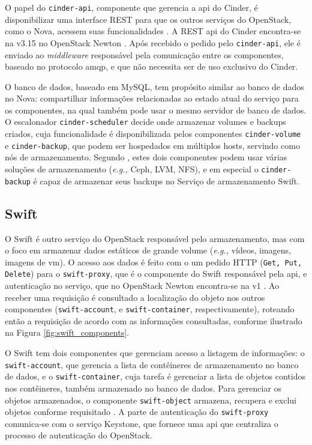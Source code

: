 O papel do \texttt{cinder-api}, componente que gerencia a \ac{api} do Cinder, é disponibilizar uma interface REST para que os outros serviços do OpenStack, como o Nova, acessem suas funcionalidades \cite{redhat:components}.
%
A REST \ac{api} do Cinder encontra-se na v3.15 no OpenStack Newton \cite{openstack:newton:api}.
%
Após recebido o pedido pelo \texttt{cinder-api}, ele é enviado ao \textit{middleware} responsável pela comunicação entre os componentes, baseado no protocolo \ac{amqp}, e que não necessita ser de uso exclusivo do Cinder.

O banco de dados, baseado em MySQL, tem propósito similar ao banco de dados no Nova: compartilhar informações relacionadas ao estado atual do serviço para os componentes, na qual também pode usar o mesmo servidor de banco de dados.
%
O escalonador \texttt{cinder-scheduler} decide onde armazenar volumes e backups criados, cuja funcionalidade é disponibilizada pelos componentes \texttt{cinder-volume} e \texttt{cinder-backup}, que podem ser hospedados em múltiplos hosts, servindo como nós de armazenamento.
%
Segundo , estes dois componentes podem usar várias soluções de armazenamento (\textit{e.g.,} Ceph, LVM, NFS), e em especial o \texttt{cinder-backup} é capaz de armazenar seus backups no Serviço de armazenamento Swift.

\subsection{Swift}

O Swift é outro serviço do OpenStack responsável pelo armazenamento, mas com o foco em armazenar dados estáticos de grande volume (\textit{e.g.,} vídeos, imagens, imagens de \ac{vm}).
%
O acesso aos dados é feito com o um pedido HTTP (\texttt{Get, Put, Delete}) para o \texttt{swift-proxy}, que é o componente do Swift responsável pela \ac{api}, e autenticação no serviço, que no OpenStack Newton encontra-se na v1 \cite{openstack:newton:api}.
%
Ao receber uma requisição é consultado a localização do objeto nos outros componentes (\texttt{swift-account}, e \texttt{swift-container}, respectivamente), roteando então a requisição de acordo com as informações consultadas, conforme ilustrado na Figura \ref{fig:swift_components}.

O Swift tem dois componentes que gerenciam acesso a listagem de informações: o \texttt{swift-account}, que gerencia a lista de contêineres de armazenamento no banco de dados, e o \texttt{swift-container}, cuja tarefa é gerenciar a lista de objetos contidos nos contêineres, também armazenado no banco de dados.
%
Para gerenciar os objetos armazenados, o componente \texttt{swift-object} armazena, recupera e exclui objetos conforme requisitado \cite{openstack:swift}.
%
A parte de autenticação do \texttt{swift-proxy} comunica-se com o serviço Keystone, que fornece uma \ac{api} que centraliza o processo de autenticação do OpenStack.

